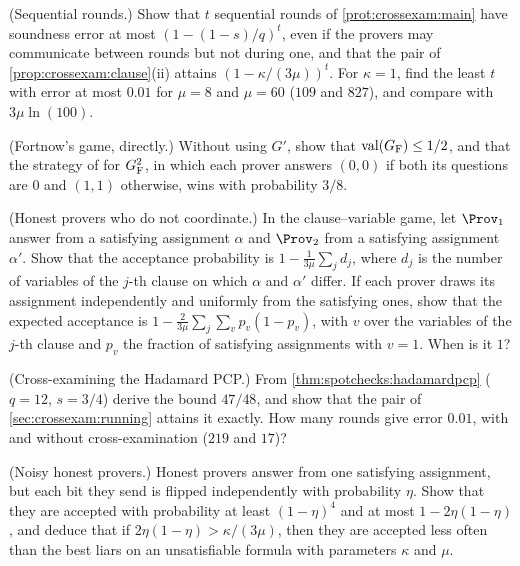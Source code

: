 \begin{refsection}
\begin{exercises}
\item \consolidation (Sequential rounds.) Show that $t$ sequential rounds of \cref{prot:crossexam:main} have soundness error at most $(1-(1-s)/q)^t$, even if the provers may communicate between rounds but not during one, and that the pair of \cref{prop:crossexam:clause}(ii) attains $(1-\kappa/(3\mu))^t$. For $\kappa=1$, find the least $t$ with error at most $0.01$ for $\mu=8$ and $\mu=60$ ($109$ and $827$), and compare with $3\mu\ln(100)$.\label{ex:crossexam:sequential}

\item \consolidation (Fortnow's game, directly.) Without using $G'$, show that $\mathrm{val}(G_{\mathrm{F}})\le1/2$, and that the strategy of \textcite{FortnowRompelSipser1994} for $G_{\mathrm{F}}^2$, in which each prover answers $(0,0)$ if both its questions are $0$ and $(1,1)$ otherwise, wins with probability $3/8$.\label{ex:crossexam:fortnow}

\item \consolidation (Honest provers who do not coordinate.) In the clause--variable game, let $\Prov_1$ answer from a satisfying assignment $\alpha$ and $\Prov_2$ from a satisfying assignment $\alpha'$. Show that the acceptance probability is $1-\frac1{3\mu}\sum_jd_j$, where $d_j$ is the number of variables of the $j$-th clause on which $\alpha$ and $\alpha'$ differ. If each prover draws its assignment independently and uniformly from the satisfying ones, show that the expected acceptance is $1-\frac2{3\mu}\sum_j\sum_vp_v(1-p_v)$, with $v$ over the variables of the $j$-th clause and $p_v$ the fraction of satisfying assignments with $v=1$. When is it $1$?\label{ex:crossexam:uncoordinated}

\item \consolidation (Cross-examining the Hadamard PCP.) From \cref{thm:spotchecks:hadamardpcp} ($q=12$, $s=3/4$) derive the bound $47/48$, and show that the pair of \cref{sec:crossexam:running} attains it exactly. How many rounds give error $0.01$, with and without cross-examination ($219$ and $17$)?\label{ex:crossexam:pcp}

\item \variation (Noisy honest provers.) Honest provers answer from one satisfying assignment, but each bit they send is flipped independently with probability $\eta$. Show that they are accepted with probability at least $(1-\eta)^4$ and at most $1-2\eta(1-\eta)$, and deduce that if $2\eta(1-\eta)>\kappa/(3\mu)$, then they are accepted less often than the best liars on an unsatisfiable formula with parameters $\kappa$ and $\mu$.\label{ex:crossexam:noisy}


\end{exercises}
\end{refsection}
